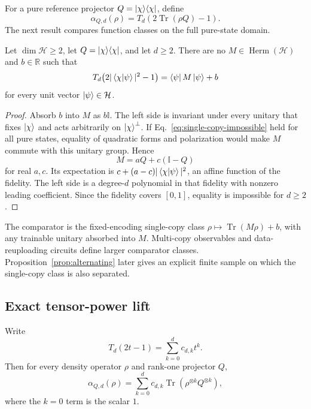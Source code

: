 \documentclass[pdflatex,sn-mathphys,NameDate,iicol]{sn-jnl}
\newcommand{\Tr}{\operatorname{Tr}}
\newcommand{\id}{\mathbb{I}}
\newcommand{\R}{\mathbb{R}}
\newcommand{\proj}[1]{\ket{#1}\!\bra{#1}}
\newcommand{\Herm}{\operatorname{Herm}}
\newcommand{\cH}{\mathcal{H}}
\begin{document}
For a pure reference projector $Q=\proj\chi$, define
\begin{equation}
  \alpha_{Q,d}(\rho)
  =
  T_d\!\left(2\Tr(\rho Q)-1\right).
  \label{eq:qfnn-atom}
\end{equation}
The next result compares function classes on the full pure-state domain.

\begin{theorem}
\label{thm:pure-separation}
Let $\dim\cH\ge2$, let $Q=\proj\chi$, and let $d\ge2$. There are no
$M\in\Herm(\cH)$ and $b\in\R$ such that
\begin{equation}
  T_d\!\left(2|\braket{\chi | \psi}|^2-1\right)
  =
  \bra\psi M\ket\psi+b
  \label{eq:single-copy-impossible}
\end{equation}
for every unit vector $\ket\psi\in\cH$.
\end{theorem}

\begin{proof}
Absorb $b$ into $M$ as $b\id$. The left side is invariant under every
unitary that fixes $\ket\chi$ and acts arbitrarily on $\ket\chi^\perp$.
If Eq.~\eqref{eq:single-copy-impossible} held for all pure states, equality
of quadratic forms and polarization would make $M$ commute with this unitary
group. Hence
\begin{equation}
  M=aQ+c(\id-Q)
\end{equation}
for real $a,c$. Its expectation is
$c+(a-c)|\braket{\chi | \psi}|^2$, an affine function of the fidelity.
The left side is a degree-$d$ polynomial in that fidelity with nonzero
leading coefficient. Since the fidelity covers $[0,1]$, equality is
impossible for $d\ge2$.
\end{proof}

\begin{remark}
The comparator is the fixed-encoding single-copy class
$\rho\mapsto\Tr(M\rho)+b$, with any trainable unitary absorbed into $M$.
Multi-copy observables and data-reuploading circuits define larger comparator
classes. Proposition~\ref{prop:alternating} later gives an explicit finite
sample on which the single-copy class is also separated.
\end{remark}

\subsection{Exact tensor-power lift}

\begin{theorem}
\label{thm:tensor-lift}
Write
\begin{equation}
  T_d(2t-1)=\sum_{k=0}^{d}c_{d,k}t^k.
  \label{eq:cheb-power-coefficients}
\end{equation}
Then for every density operator $\rho$ and rank-one projector $Q$,
\begin{equation}
  \alpha_{Q,d}(\rho)
  =
  \sum_{k=0}^{d}
  c_{d,k}
  \Tr\!\left(\rho^{\otimes k}Q^{\otimes k}\right),
  \label{eq:tensor-lift}
\end{equation}
where the $k=0$ term is the scalar $1$.
\end{theorem}
\end{document}
